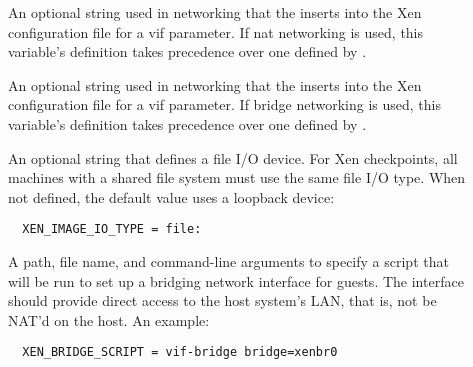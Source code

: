 \begin{description}
\item[]
  \label{param:XenNatVIFParameter}
  An optional string used in networking that the 
  inserts into the Xen configuration file for a vif parameter.
  If nat networking is used, this variable's definition takes
  precedence over one defined by .

\item[]
  \label{param:XenBridgeVIFParameter}
  An optional string used in networking that the 
  inserts into the Xen configuration file for a vif parameter.
  If bridge networking is used, this variable's definition takes
  precedence over one defined by .

\item[]
  \label{param:XenImageIOType}
  An optional string that defines a file I/O device.
  For Xen checkpoints, all machines with a shared file system must
  use the same file I/O type.
  When not defined, the default value uses a loopback device:
  \begin{verbatim}
  XEN_IMAGE_IO_TYPE = file:
  \end{verbatim}

\item[]
  \label{param:XenBridgeScript}
  A path, file name, and command-line arguments to specify a script
  that will be run to set up a bridging network interface for guests.
  The interface should provide direct access to the host system's LAN,
  that is, not be NAT'd on the host.
  An example:
  \begin{verbatim}
  XEN_BRIDGE_SCRIPT = vif-bridge bridge=xenbr0
  \end{verbatim}




\end{description}
